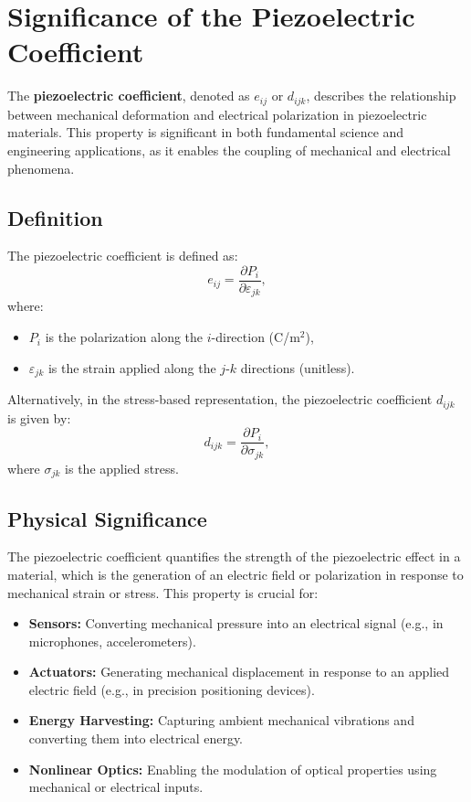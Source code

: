 \documentclass[12pt]{article}
\begin{document}
\section*{Significance of the Piezoelectric Coefficient}

The \textbf{piezoelectric coefficient}, denoted as $e_{ij}$ or $d_{ijk}$, describes the relationship between mechanical deformation and electrical polarization in piezoelectric materials. This property is significant in both fundamental science and engineering applications, as it enables the coupling of mechanical and electrical phenomena.

\subsection*{Definition}
The piezoelectric coefficient is defined as:
\[
e_{ij} = \frac{\partial P_i}{\partial \varepsilon_{jk}},
\]
where:
\begin{itemize}
    \item $P_i$ is the polarization along the $i$-direction (C/m$^2$),
    \item $\varepsilon_{jk}$ is the strain applied along the $j$-$k$ directions (unitless).
\end{itemize}

Alternatively, in the stress-based representation, the piezoelectric coefficient $d_{ijk}$ is given by:
\[
d_{ijk} = \frac{\partial P_i}{\partial \sigma_{jk}},
\]
where $\sigma_{jk}$ is the applied stress.

\subsection*{Physical Significance}
The piezoelectric coefficient quantifies the strength of the piezoelectric effect in a material, which is the generation of an electric field or polarization in response to mechanical strain or stress. This property is crucial for:
\begin{itemize}
    \item \textbf{Sensors:} Converting mechanical pressure into an electrical signal (e.g., in microphones, accelerometers).
    \item \textbf{Actuators:} Generating mechanical displacement in response to an applied electric field (e.g., in precision positioning devices).
    \item \textbf{Energy Harvesting:} Capturing ambient mechanical vibrations and converting them into electrical energy.
    \item \textbf{Nonlinear Optics:} Enabling the modulation of optical properties using mechanical or electrical inputs.
\end{itemize}
\end{document}
